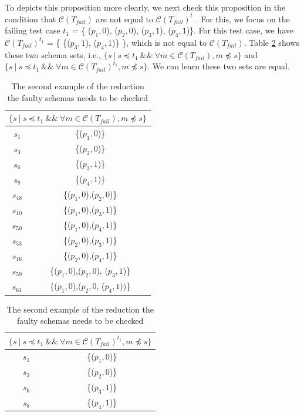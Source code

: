 To depicts this proposition more clearly, we next check this proposition in the condition that $\mathcal{C}(T_{fail})$ are not equal to $\mathcal{C}(T_{fail})^{t}$ . For this, we focus on the failing test case $t_{1}$ =  \{ ($p_{1}, 0$), ($p_{2}, 0$), ($p_{3}, 1$), ($p_{4}, 1$)\}. For this test case, we have $\mathcal{C}(T_{fail})^{t_{1}}$ = \{ \{($p_{3}, 1$), ($p_{4}, 1$)\} \}, which is not equal to $\mathcal{C}(T_{fail})$. Table \ref{ex:mfssintequal} shows these two schema sets, i.e., $\{ s\ |\  s \preceq t_{1}\ \&\&\ \forall m \in \mathcal{C}(T_{fail}),  m \npreceq s \}$ and $\{ s\ |\  s \preceq t_{1}\ \&\&\ \forall m \in \mathcal{C}(T_{fail})^{t_{1}},  m \npreceq s \}$. We can learn these two sets are equal.

\begin{table}[htbp]
  \centering
  \caption{The second example of the reduction the faulty schemas needs to be checked}
  \label{ex:mfssintequal}
    \begin{tabular}{|c|c|} \hline
     \multicolumn{2}{|c|}{$\{ s\ |\ s \preceq t_{1}\ \&\&\ \forall m \in \mathcal{C}(T_{fail}),  m \npreceq s \}$} \\ \hline
   $s_{1}$ & \{($p_{1}, 0$)\} \\
   $s_{3}$ & \{($p_{2}, 0$)\} \\
   $s_{6}$ & \{($p_{3}, 1$)\} \\
   $s_{8}$ & \{($p_{4}, 1$)\} \\

   $s_{48}$ & \{($p_{1}, 0$),($p_{2}, 0$)\} \\

   $s_{10}$ & \{($p_{1}, 0$),($p_{3}, 1$)\} \\
   $s_{50}$ & \{($p_{1}, 0$),($p_{4}, 1$)\} \\

   $s_{53}$ & \{($p_{2}, 0$),($p_{3}, 1$)\} \\
   $s_{16}$ & \{($p_{2}, 0$),($p_{4}, 1$)\} \\

   $s_{59}$ & \{($p_{1}, 0$),($p_{2}, 0$), ($p_{3}, 1$)\} \\
   $s_{61}$ & \{($p_{1}, 0$),($p_{2}, 0$,  ($p_{4}, 1$))\} \\

    \hline
    \end{tabular}%
\quad
    \begin{tabular}{|c|c|} \hline
   \multicolumn{2}{|c|}{$\{ s\ |\ s \preceq t_{1}\ \&\&\ \forall m \in \mathcal{C}(T_{fail})^{t_{1}},  m \npreceq s \}$}\\ \hline
   $s_{1}$ & \{($p_{1}, 0$)\} \\
   $s_{3}$ & \{($p_{2}, 0$)\} \\
   $s_{6}$ & \{($p_{3}, 1$)\} \\
   $s_{8}$ & \{($p_{4}, 1$)\} \\


\end{tabular}
\end{table}
